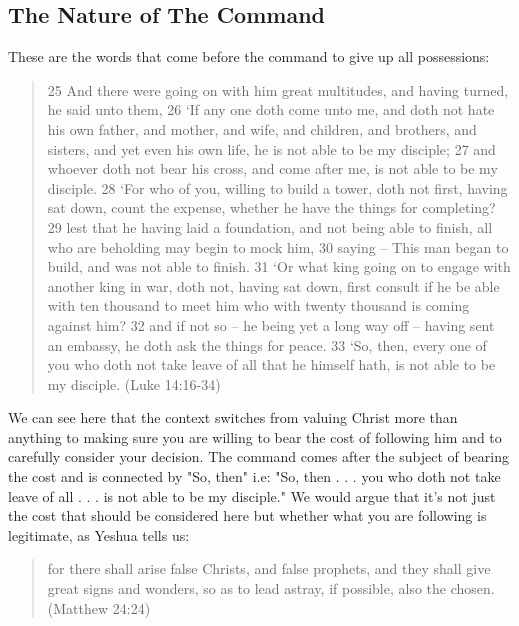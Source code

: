 \documentclass[11pt]{article}
\begin{document}
\subsection{The Nature of The Command}
These are the words that come before the command to give up all possessions:
\begin{quote}
25 And there were going on with him great multitudes, and having turned, he said unto them,
26 `If any one doth come unto me, and doth not hate his own father, and mother, and wife, and children, and brothers, and sisters, and yet even his own life, he is not able to be my disciple;
27 and whoever doth not bear his cross, and come after me, is not able to be my disciple.
28 `For who of you, willing to build a tower, doth not first, having sat down, count the expense, whether he have the things for completing?
29 lest that he having laid a foundation, and not being able to finish, all who are beholding may begin to mock him,
30 saying -- This man began to build, and was not able to finish.
31 `Or what king going on to engage with another king in war, doth not, having sat down, first consult if he be able with ten thousand to meet him who with twenty thousand is coming against him?
32 and if not so -- he being yet a long way off -- having sent an embassy, he doth ask the things for peace.
33 `So, then, every one of you who doth not take leave of all that he himself hath, is not able to be my disciple. (Luke 14:16-34)
\end{quote}
We can see here that the context switches from valuing Christ more than anything to making sure you are willing to bear the cost of following him and to carefully consider your decision. The command comes after the subject of bearing the cost and is connected by "So, then" i.e: "So, then . . . you who doth not take leave of all . . . is not able to be my disciple." We would argue that it's not just the cost that should be considered here but whether what you are following is legitimate, as Yeshua tells us:

\begin{quote}
for there shall arise false Christs, and false prophets, and they shall give great signs and wonders, so as to lead astray, if possible, also the chosen. (Matthew 24:24) 
\end{quote}
\end{document}
